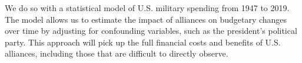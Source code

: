 We do so with a statistical model of U.S. military spending from 1947 to 2019. The model allows us to estimate the impact of alliances on budgetary changes over time by adjusting for confounding variables, such as the president's political party. This approach will pick up the full financial costs and benefits of U.S. alliances, including those that are difficult to directly observe.%





